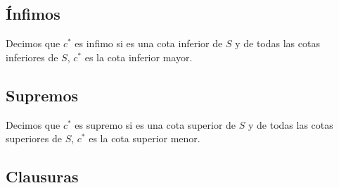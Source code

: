\documentclass[../main.tex]{subfiles}
\begin{document}
\subsection{Ínfimos}
Decimos que $c^*$ es infimo si es una cota inferior de $S$ y de todas las cotas inferiores de $S$, $c^*$ es la cota inferior mayor.

\subsection{Supremos}
Decimos que $c^*$ es supremo si es una cota superior de $S$ y de todas las cotas superiores de $S$, $c^*$ es la cota superior menor.

\subsection{Clausuras}
\end{document}
